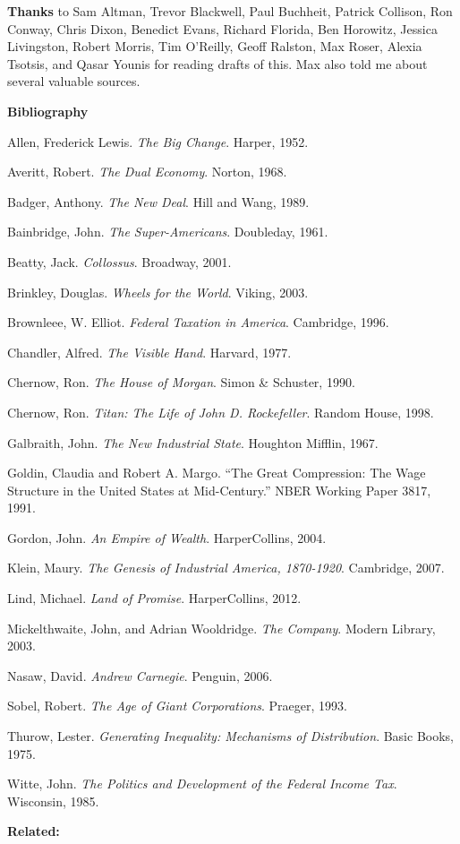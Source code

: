 \textbf{Thanks} to Sam Altman, Trevor Blackwell, Paul Buchheit, Patrick
Collison, Ron Conway, Chris Dixon, Benedict Evans, Richard Florida, Ben
Horowitz, Jessica Livingston, Robert Morris, Tim O'Reilly, Geoff
Ralston, Max Roser, Alexia Tsotsis, and Qasar Younis for reading drafts
of this. Max also told me about several valuable sources.

\textbf{Bibliography}

Allen, Frederick Lewis. \emph{The Big Change}. Harper, 1952.

Averitt, Robert. \emph{The Dual Economy}. Norton, 1968.

Badger, Anthony. \emph{The New Deal}. Hill and Wang, 1989.

Bainbridge, John. \emph{The Super-Americans}. Doubleday, 1961.

Beatty, Jack. \emph{Collossus}. Broadway, 2001.

Brinkley, Douglas. \emph{Wheels for the World}. Viking, 2003.

Brownleee, W. Elliot. \emph{Federal Taxation in America}. Cambridge,
1996.

Chandler, Alfred. \emph{The Visible Hand}. Harvard, 1977.

Chernow, Ron. \emph{The House of Morgan}. Simon \& Schuster, 1990.

Chernow, Ron. \emph{Titan: The Life of John D. Rockefeller}. Random
House, 1998.

Galbraith, John. \emph{The New Industrial State}. Houghton Mifflin,
1967.

Goldin, Claudia and Robert A. Margo. ``The Great Compression: The Wage
Structure in the United States at Mid-Century.'' NBER Working Paper
3817, 1991.

Gordon, John. \emph{An Empire of Wealth}. HarperCollins, 2004.

Klein, Maury. \emph{The Genesis of Industrial America, 1870-1920}.
Cambridge, 2007.

Lind, Michael. \emph{Land of Promise}. HarperCollins, 2012.

Mickelthwaite, John, and Adrian Wooldridge. \emph{The Company}. Modern
Library, 2003.

Nasaw, David. \emph{Andrew Carnegie}. Penguin, 2006.

Sobel, Robert. \emph{The Age of Giant Corporations}. Praeger, 1993.

Thurow, Lester. \emph{Generating Inequality: Mechanisms of
Distribution}. Basic Books, 1975.

Witte, John. \emph{The Politics and Development of the Federal Income
Tax}. Wisconsin, 1985.

\textbf{Related:}
